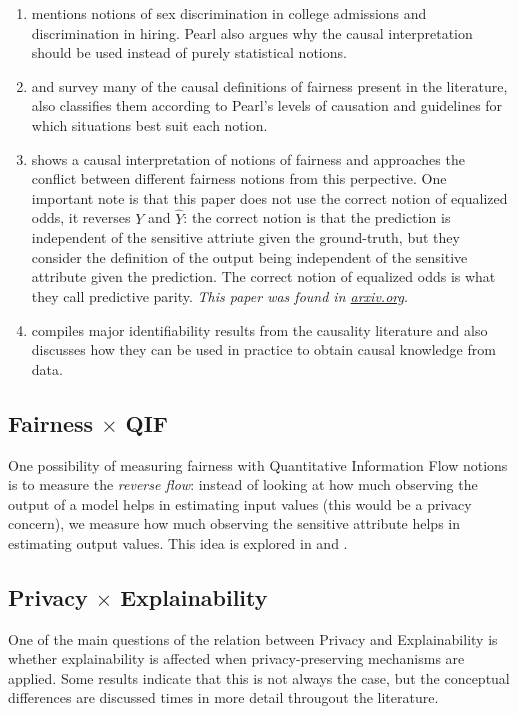 \begin{enumerate}
\item \cite{Causality} mentions notions of sex discrimination in college admissions and discrimination in hiring. Pearl also argues why the causal interpretation should be used instead of purely statistical notions.
\item \cite{makhlouf2024causality} and \cite{su2022review} survey many of the causal definitions of fairness present in the literature, \cite{makhlouf2024causality} also classifies them according to Pearl's levels of causation and guidelines for which situations best suit each notion.
\item \cite{saravanakumar2020impossibility} shows a causal interpretation of notions of fairness and approaches the conflict between different fairness notions from this perpective. One important note is that this paper does not use the correct notion of equalized odds, it reverses $Y$ and $\hat{Y}$: the correct notion is that the prediction is independent of the sensitive attriute given the ground-truth, but they consider the definition of the output being independent of the sensitive attribute given the prediction. The correct notion of equalized odds is what they call predictive parity. \emph{This paper was found in \url{arxiv.org}}.
\item \cite{makhlouf2022identifiability} compiles major identifiability results from the causality literature and also discusses how they can be used in practice to obtain causal knowledge from data.
\end{enumerate}

\subsection{Fairness $\times$ QIF}

One possibility of measuring fairness with Quantitative Information Flow notions is to measure the \emph{reverse flow}: instead of looking at how much observing the output of a model helps in estimating input values (this would be a privacy concern), we measure how much observing the sensitive attribute helps in estimating output values. This idea is explored in \cite{Bruno} and \cite{nogueira2023relation}.

\subsection{Privacy $\times$ Explainability}

One of the main questions of the relation between Privacy and Explainability is whether explainability is affected when privacy-preserving mechanisms are applied. Some results indicate that this is not always the case, but the conceptual differences are discussed times in more detail througout the literature. 

